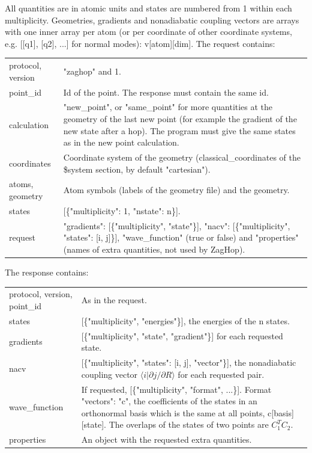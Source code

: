 \documentclass{report}
\begin{document}
All quantities are in atomic units and states are numbered from 1 within each multiplicity. Geometries, gradients and nonadiabatic coupling vectors are arrays with one inner array per atom (or per coordinate of other coordinate systems, e.g. [[q1], [q2], ...] for normal modes): v[atom][dim]. The request contains:
\begin{tabularx}{\textwidth}{ m{3cm} X }
	protocol, version & "zaghop" and 1. \\
	point\_id & Id of the point. The response must contain the same id. \\
	calculation & "new\_point", or "same\_point" for more quantities at the geometry of the last new point (for example the gradient of the new state after a hop). The program must give the same states as in the new point calculation. \\
	coordinates & Coordinate system of the geometry (classical\_coordinates of the \$system section, by default "cartesian"). \\
	atoms, geometry & Atom symbols (labels of the geometry file) and the geometry. \\
	states & [\{"multiplicity": 1, "nstate": n\}]. \\
	request & "gradients": [\{"multiplicity", "state"\}], "nacv": [\{"multiplicity", "states": [i, j]\}], "wave\_function" (true or false) and "properties" (names of extra quantities, not used by ZagHop).
\end{tabularx}
The response contains:
\begin{tabularx}{\textwidth}{ m{3cm} X }
	protocol, version, point\_id & As in the request. \\
	states & [\{"multiplicity", "energies"\}], the energies of the n states. \\
	gradients & [\{"multiplicity", "state", "gradient"\}] for each requested state. \\
	nacv & [\{"multiplicity", "states": [i, j], "vector"\}], the nonadiabatic coupling vector $\langle i | \partial j / \partial R \rangle$ for each requested pair. \\
	wave\_function & If requested, [\{"multiplicity", "format", ...\}]. Format "vectors": "c", the coefficients of the states in an orthonormal basis which is the same at all points, c[basis][state]. The overlaps of the states of two points are $C_1^T C_2$. \\
	properties & An object with the requested extra quantities.
\end{tabularx}
\end{document}
